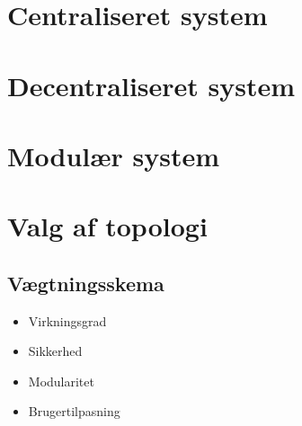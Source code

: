 \section{Centraliseret system}

\section{Decentraliseret system}

\section{Modulær system}

\section{Valg af topologi}

\subsection{Vægtningsskema}

\begin{itemize}
	\item Virkningsgrad
	\item Sikkerhed
	\item Modularitet
	\item Brugertilpasning
\end{itemize}